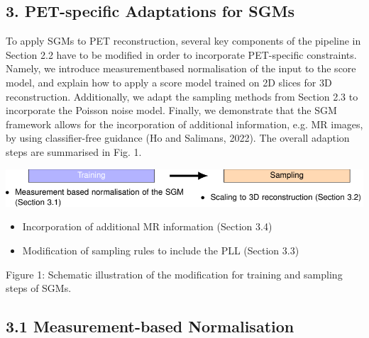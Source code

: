 \documentclass{article}
\begin{document}
\subsection{3. PET-specific Adaptations for SGMs}

To apply SGMs to PET reconstruction, several key components of the pipeline in Section 2.2 have to be modified in order to incorporate PET-specific constraints. Namely, we introduce measurementbased normalisation of the input to the score model, and explain how to apply a score model trained on 2D slices for 3D reconstruction. Additionally, we adapt the sampling methods from Section 2.3 to incorporate the Poisson noise model. Finally, we demonstrate that the SGM framework allows for the incorporation of additional information, e.g. MR images, by using classifier-free guidance (Ho and Salimans, 2022). The overall adaption steps are summarised in Fig. 1.


\includegraphics{_page_6_Figure_7.png}

\begin{itemize}
\item 
Incorporation of additional MR information (Section 3.4)

\item 
Modification of sampling rules to include the PLL (Section 3.3)

\end{itemize}

Figure 1: Schematic illustration of the modification for training and sampling steps of SGMs.

\subsection{3.1 Measurement-based Normalisation}
\end{document}
